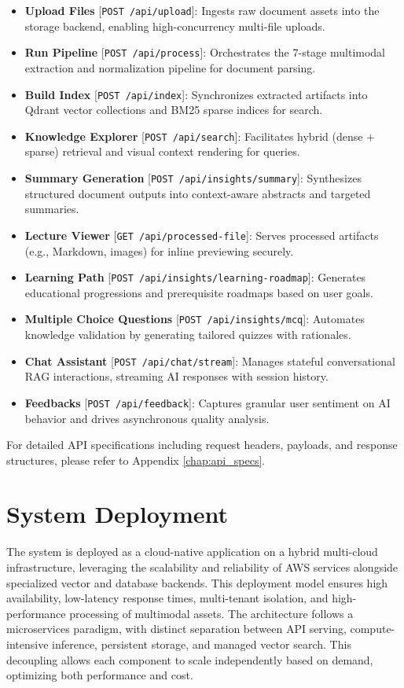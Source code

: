 \begin{itemize}
    \item \textbf{Upload Files} [\texttt{POST /api/upload}]: Ingests raw document assets into the storage backend, enabling high-concurrency multi-file uploads.
    \item \textbf{Run Pipeline} [\texttt{POST /api/process}]: Orchestrates the 7-stage multimodal extraction and normalization pipeline for document parsing.
    \item \textbf{Build Index} [\texttt{POST /api/index}]: Synchronizes extracted artifacts into Qdrant vector collections and BM25 sparse indices for search.
    \item \textbf{Knowledge Explorer} [\texttt{POST /api/search}]: Facilitates hybrid (dense + sparse) retrieval and visual context rendering for queries.
    \item \textbf{Summary Generation} [\texttt{POST /api/insights/summary}]: Synthesizes structured document outputs into context-aware abstracts and targeted summaries.
    \item \textbf{Lecture Viewer} [\texttt{GET /api/processed-file}]: Serves processed artifacts (e.g., Markdown, images) for inline previewing securely.
    \item \textbf{Learning Path} [\texttt{POST /api/insights/learning-roadmap}]: Generates educational progressions and prerequisite roadmaps based on user goals.
    \item \textbf{Multiple Choice Questions} [\texttt{POST /api/insights/mcq}]: Automates knowledge validation by generating tailored quizzes with rationales.
    \item \textbf{Chat Assistant} [\texttt{POST /api/chat/stream}]: Manages stateful conversational RAG interactions, streaming AI responses with session history.
    \item \textbf{Feedbacks} [\texttt{POST /api/feedback}]: Captures granular user sentiment on AI behavior and drives asynchronous quality analysis.
\end{itemize}

For detailed API specifications including request headers, payloads, and response structures, please refer to Appendix \ref{chap:api_specs}.

\section{System Deployment}

The system is deployed as a cloud-native application on a hybrid multi-cloud infrastructure, leveraging the scalability and reliability of AWS services alongside specialized vector and database backends. This deployment model ensures high availability, low-latency response times, multi-tenant isolation, and high-performance processing of multimodal assets. The architecture follows a microservices paradigm, with distinct separation between API serving, compute-intensive inference, persistent storage, and managed vector search. This decoupling allows each component to scale independently based on demand, optimizing both performance and cost.

